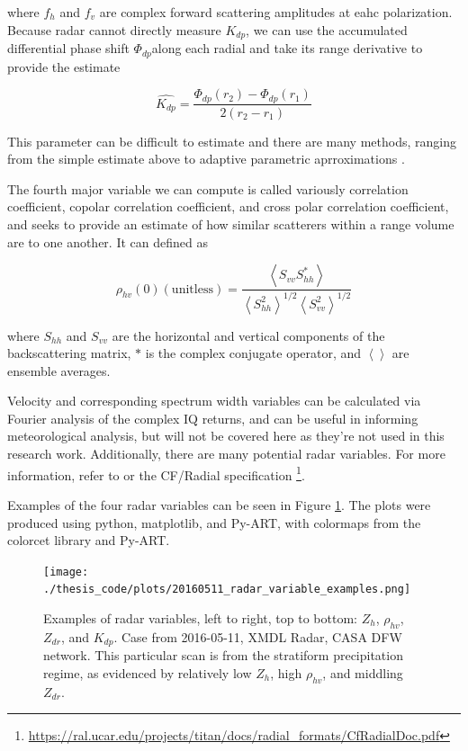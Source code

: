 where $f_h$ and $f_v$ are complex forward scattering amplitudes at eahc polarization.
Because radar cannot directly measure $K_{dp}$, we can use the accumulated differential phase shift $\Phi_{dp}$along each radial and take its range derivative to provide the estimate

\begin{equation}
\hat{K_{dp}} = \frac{\Phi_{dp}(r_2)-\Phi_{dp}(r_1)}{2(r_2-r_1)}
\end{equation}

This parameter can be difficult to estimate and there are many methods, ranging from the simple estimate above to adaptive parametric aprroximations \cite{wang2009algorithm}.

The fourth major variable we can compute is called variously correlation coefficient, copolar correlation coefficient, and cross polar correlation coefficient, and seeks to provide an estimate of how similar scatterers within a range volume are to one another.
It can defined as

\begin{equation}
\rho_{hv} (0) (\mathrm{unitless}) = \frac{\left\langle S_{vv} S_{hh}^* \right\rangle}{\left\langle S^2_{hh}\right\rangle^{1/2} \left\langle S^2_{vv}\right\rangle^{1/2}}
\end{equation}

where $S_{hh}$ and $S_{vv}$ are the horizontal and vertical components of the backscattering matrix, $*$ is the complex conjugate operator, and $\left\langle\right\rangle$ are ensemble averages.

Velocity and corresponding spectrum width variables can be calculated via Fourier analysis of the complex IQ returns, and can be useful in informing meteorological analysis, but will not be covered here as they're not used in this research work.
Additionally, there are many potential radar variables.
For more information, refer to \cite{bringi2001polarimetric} or the CF/Radial specification \footnote{\url{https://ral.ucar.edu/projects/titan/docs/radial_formats/CfRadialDoc.pdf}}.

Examples of the four radar variables can be seen in Figure \ref{fig:background_radarvar_examples}.
The plots were produced using python, matplotlib, and Py-ART, with colormaps from the colorcet library and Py-ART.

\begin{figure}[h]
	\centering
	\texttt{[image: ./thesis\_code/plots/20160511\_radar\_variable\_examples.png]}
	\caption{Examples of radar variables, left to right, top to bottom: $Z_h$, $\rho_{hv}$, $Z_{dr}$, and $K_{dp}$. Case from 2016-05-11, XMDL Radar, CASA DFW network. This particular scan is from the stratiform precipitation regime, as evidenced by relatively low $Z_h$, high $\rho_{hv}$, and middling $Z_{dr}$.}
	\label{fig:background_radarvar_examples}
\end{figure}

